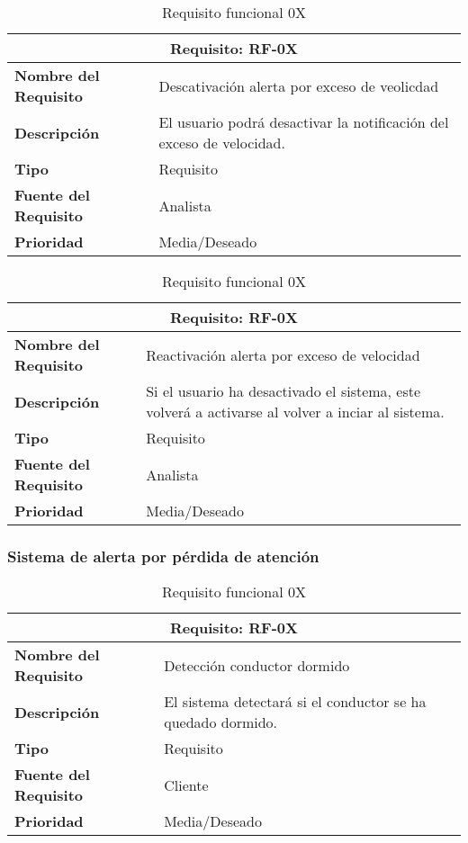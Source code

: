 \documentclass[10pt,a4paper,oldfontcommands]{dpds}
\begin{document}
\begin{table}[H]
\begin{center}
\begin{tabular}{p{} p{7cm}}
\multicolumn{2}{c}{\textbf{Requisito: RF-0X} } \\
\hline \hline
\textbf{Nombre del Requisito} & Descativación alerta por exceso de veolicdad \\
\textbf{Descripción} & El usuario podrá desactivar la notificación del exceso de velocidad. \\
\textbf{Tipo} & Requisito  \\
\textbf{Fuente del Requisito} & Analista  \\
\textbf{Prioridad} & Media/Deseado  \\ \hline
\end{tabular}
\caption{Requisito funcional 0X}
\label{tab:personal}
\end{center}
\end{table}

\begin{table}[H]
\begin{center}
\begin{tabular}{p{} p{7cm}}
\multicolumn{2}{c}{\textbf{Requisito: RF-0X} } \\
\hline \hline
\textbf{Nombre del Requisito} & Reactivación alerta por exceso de  velocidad \\
\textbf{Descripción} & Si el usuario ha desactivado el sistema, este volverá a activarse al volver a inciar al sistema. \\
\textbf{Tipo} & Requisito  \\
\textbf{Fuente del Requisito} & Analista  \\
\textbf{Prioridad} & Media/Deseado  \\ \hline
\end{tabular}
\caption{Requisito funcional 0X}
\label{tab:personal}
\end{center}
\end{table}


\subsubsection{Sistema de alerta por pérdida de atención}

\begin{table}[H]
\begin{center}
\begin{tabular}{p{} p{7cm}}
\multicolumn{2}{c}{\textbf{Requisito: RF-0X} } \\
\hline \hline
\textbf{Nombre del Requisito} & Detección conductor dormido\\
\textbf{Descripción} & El sistema detectará si el conductor se ha quedado dormido.\\
\textbf{Tipo} & Requisito  \\
\textbf{Fuente del Requisito} & Cliente  \\
\textbf{Prioridad} & Media/Deseado  \\ \hline
\end{tabular}
\caption{Requisito funcional 0X}
\label{tab:personal}
\end{center}
\end{table}
\end{document}
